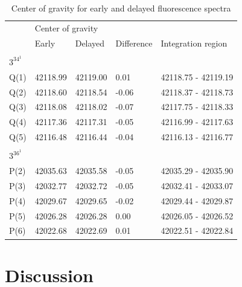 \documentclass[12pt]{mitthesis}
\begin{document}
\begin{table}
  \caption{Center of gravity for early and delayed fluorescence spectra}
  \label{table:cogs}
  \centering
  \begin{tabular}{lllll}
       & \multicolumn{2}{l}{Center of gravity} &       \\
       & Early    & Delayed  & Difference & Integration region      \\
  \midrule
  \\
  \multicolumn{4}{l}{$3^34^1$} \\
  \midrule
  Q(1) & 42118.99 & 42119.00 &  0.01 & 42118.75 - 42119.19 \\
  Q(2) & 42118.60 & 42118.54 & -0.06 & 42118.37 - 42118.73 \\
  Q(3) & 42118.08 & 42118.02 & -0.07 & 42117.75 - 42118.33 \\
  Q(4) & 42117.36 & 42117.31 & -0.05 & 42116.99 - 42117.63 \\
  Q(5) & 42116.48 & 42116.44 & -0.04 & 42116.13 - 42116.77 \\
  \\
  \multicolumn{4}{l}{$3^36^1$} \\
  \midrule
  P(2) & 42035.63 & 42035.58 & -0.05 & 42035.29 - 42035.90 \\
  P(3) & 42032.77 & 42032.72 & -0.05 & 42032.41 - 42033.07 \\
  P(4) & 42029.67 & 42029.65 & -0.02 & 42029.44 - 42029.87 \\
  P(5) & 42026.28 & 42026.28 &  0.00 & 42026.05 - 42026.52 \\
  P(6) & 42022.68 & 42022.69 &  0.01 & 42022.51 - 42022.84 \\

\end{tabular}
\end{table}



\section{Discussion}

\end{document}
